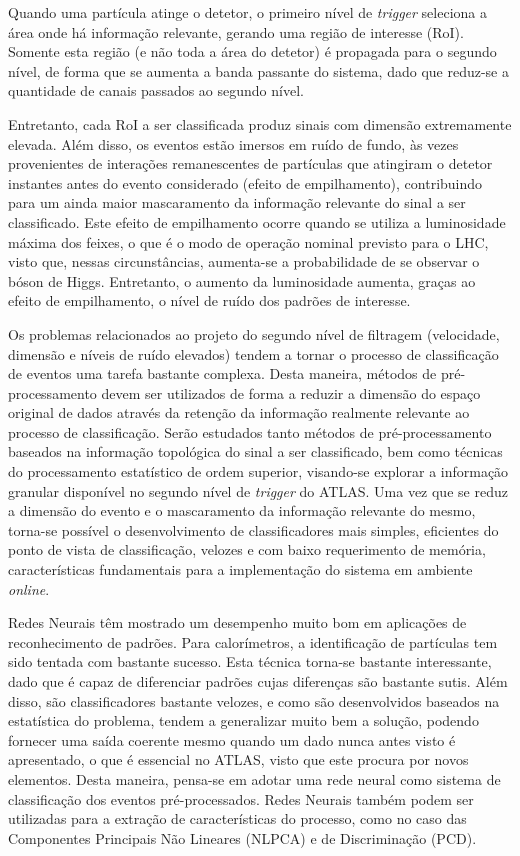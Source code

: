 Quando uma partícula atinge o detetor, o primeiro nível de \emph{trigger} seleciona a área onde há informação relevante, gerando uma região de interesse (RoI). Somente esta região (e não toda a área do detetor) é propagada para o segundo nível, de forma que se aumenta a banda passante do sistema, dado que reduz-se a quantidade de canais passados ao segundo nível.

Entretanto, cada RoI a ser classificada produz sinais com dimensão extremamente elevada. Além disso, os eventos estão imersos em ruído de fundo, às vezes provenientes de interações remanescentes de partículas que atingiram o detetor instantes antes do evento considerado (efeito de empilhamento), contribuindo para um ainda maior mascaramento da informação relevante do sinal a ser classificado. Este efeito de empilhamento ocorre quando se utiliza a luminosidade máxima dos feixes, o que é o modo de operação nominal previsto para o LHC, visto que, nessas circunstâncias, aumenta-se a probabilidade de se observar o bóson de Higgs. Entretanto, o aumento da luminosidade aumenta, graças ao efeito de empilhamento, o nível de ruído dos padrões de interesse.

Os problemas relacionados ao projeto do segundo nível de filtragem (velocidade, dimensão e níveis de ruído elevados) tendem a tornar o processo de classificação de eventos uma tarefa bastante complexa. Desta maneira, métodos de pré-processamento devem ser utilizados de forma a reduzir a dimensão do espaço original de dados através da retenção da informação realmente relevante ao processo de classificação. Serão estudados tanto métodos de pré-processamento baseados na informação topológica do sinal a ser classificado, bem como técnicas do processamento estatístico de ordem superior, visando-se explorar a informação granular disponível no segundo nível de \emph{trigger} do ATLAS. Uma vez que se reduz a dimensão do evento e o mascaramento da informação relevante do mesmo, torna-se possível o desenvolvimento de classificadores mais simples, eficientes do ponto de vista de classificação, velozes e com baixo requerimento de memória, características fundamentais para a implementação do sistema em ambiente \emph{online}.

Redes Neurais têm mostrado um desempenho muito bom em aplicações de reconhecimento de padrões. Para calorímetros, a identificação de partículas tem sido tentada com bastante sucesso. Esta técnica torna-se bastante interessante, dado que é capaz de diferenciar padrões cujas diferenças são bastante sutis. Além disso, são classificadores bastante velozes, e como são desenvolvidos baseados na estatística do problema, tendem a generalizar muito bem a solução, podendo fornecer uma saída coerente mesmo quando um dado nunca antes visto é apresentado, o que é essencial no ATLAS, visto que este procura por novos elementos. Desta maneira, pensa-se em adotar uma rede neural como sistema de classificação dos eventos pré-processados. Redes Neurais também podem ser utilizadas para a extração de características do processo, como no caso das Componentes Principais Não Lineares (NLPCA) e de Discriminação (PCD).

